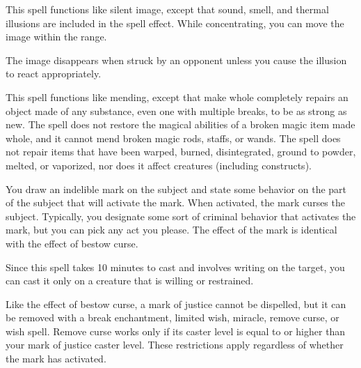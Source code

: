 \begin{multicols}{2}
\begin{small}
\smallskip\noindent This spell functions like silent image, except that sound, smell, and thermal illusions are included in the spell effect. While concentrating, you can move the image within the range. 

\smallskip\noindent The image disappears when struck by an opponent unless you cause the illusion to react appropriately.

\noindent This spell functions like mending, except that make whole completely repairs an object made of any substance, even one with multiple breaks, to be as strong as new. The spell does not restore the magical abilities of a broken magic item made whole, and it cannot mend broken magic rods, staffs, or wands. The spell does not repair items that have been warped, burned, disintegrated, ground to powder, melted, or vaporized, nor does it affect creatures (including constructs).

\noindent You draw an indelible mark on the subject and state some behavior on the part of the subject that will activate the mark. When activated, the mark curses the subject. Typically, you designate some sort of criminal behavior that activates the mark, but you can pick any act you please. The effect of the mark is identical with the effect of bestow curse.

\smallskip\noindent Since this spell takes 10 minutes to cast and involves writing on the target, you can cast it only on a creature that is willing or restrained.

\smallskip\noindent Like the effect of bestow curse, a mark of justice cannot be dispelled, but it can be removed with a break enchantment, limited wish, miracle, remove curse, or wish spell. Remove curse works only if its caster level is equal to or higher than your mark of justice caster level. These restrictions apply regardless of whether the mark has activated.


\end{small}
\end{multicols}
